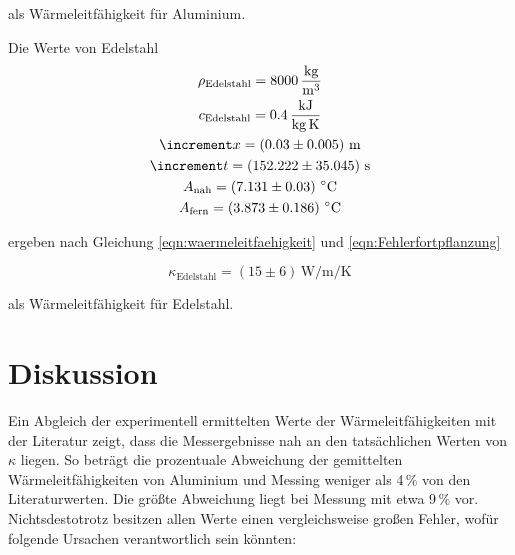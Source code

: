 als Wärmeleitfähigkeit für Aluminium.
\hfill \break

Die Werte von Edelstahl
\begin{gather*}
  \rho_\text{Edelstahl} = 8000\,\unit[per-mode=fraction]{\kilo\gram\per\cubic\meter} \\
  c_\text{Edelstahl} = 0.4\,\unit{\kilo\joule\per\kilo\gram\per\kelvin} \\
  \increment x = \left(0.03\pm0.005\right)\,\unit{\meter} \\
  \increment t = \left(152.222\pm35.045\right)\,\unit{\second} \\
  A_\text{nah} = \left(7.131\pm0.03\right)\,\unit{\celsius}\\
  A_\text{fern} = \left(3.873\pm0.186\right)\,\unit{\celsius}\\
\end{gather*}

ergeben nach Gleichung \eqref{eqn:waermeleitfaehigkeit} und \eqref{eqn:Fehlerfortpflanzung}

\begin{equation}
  \kappa_\text{Edelstahl} = \left(15\pm6\right)\,\unit{\watt\per\meter\per\kelvin}
\end{equation}

als Wärmeleitfähigkeit für Edelstahl.
\hfill \break

\section{Diskussion}
 
Ein Abgleich der experimentell ermittelten Werte der Wärmeleitfähigkeiten mit der Literatur zeigt, dass die Messergebnisse nah 
an den tatsächlichen Werten von $\kappa$ liegen. So beträgt die prozentuale Abweichung der gemittelten Wärmeleitfähigkeiten von 
Aluminium und Messing weniger als 4\,$\unit{\percent}$ von den Literaturwerten. Die größte Abweichung liegt bei Messung mit etwa
9\,$\unit{\percent}$ vor. Nichtsdestotrotz besitzen allen Werte einen vergleichsweise großen Fehler, wofür folgende Ursachen
verantwortlich sein könnten:\\\\

